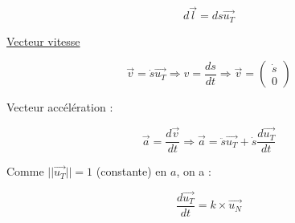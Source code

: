 \documentclass{article}
\begin{document}
$$\boxed{d\overrightarrow{l}=ds\overrightarrow{u_T}}$$

\underline{Vecteur vitesse}

$$\boxed{\overrightarrow{v}=\dot{s}\overrightarrow{u_T}}\Longrightarrow\boxed{v=\frac{ds}{dt}}
\Longrightarrow
\boxed{\overrightarrow{v}=\left(\begin{array}{c}\dot{s}\\0\end{array}\right)}$$

Vecteur accélération :

$$
\overrightarrow{a}=\frac{d\overrightarrow{v}}{dt}
\Longrightarrow \overrightarrow{a}=\ddot{s}\overrightarrow{u_T}+\dot{s}\frac{d\overrightarrow{u_T}}{dt}
$$

Comme $||\overrightarrow{u_T}||=1$ (constante) en $a$, on a :

$$\frac{d\overrightarrow{u_T}}{dt} = k\times\overrightarrow{u_N}$$
\end{document}
